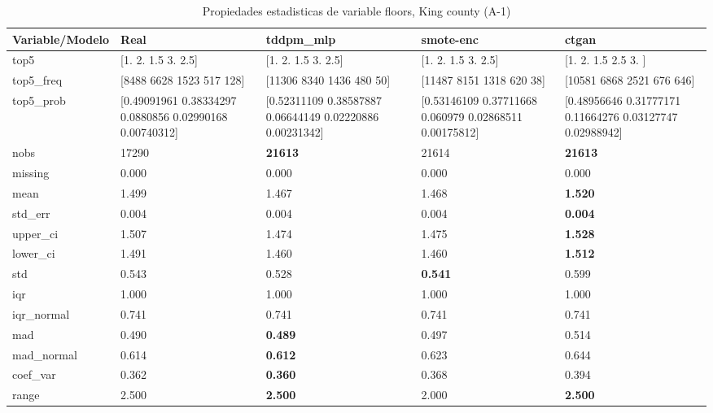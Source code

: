 \begin{table}[H]
\centering
\fontsize{8}{14}\selectfont
\caption{Propiedades  estadisticas de variable floors, King county (A-1)}
\label{table-stats-king county-a-1-floors}
\begin{tabular}{|l|m{10em}|m{10em}|m{10em}|m{10em}|}
\hline
 \rowcolor[gray]{0.8}
Variable/Modelo & Real & tddpm\_mlp & smote-enc & ctgan \\
\hline top5 & [1.  2.  1.5 3.  2.5] & [1.  2.  1.5 3.  2.5] & [1.  2.  1.5 3.  2.5] & [1.  2.  1.5 2.5 3. ] \\
\hline top5\_freq & [8488 6628 1523  517  128] & [11306  8340  1436   480    50] & [11487  8151  1318   620    38] & [10581  6868  2521   676   646] \\
\hline top5\_prob & [0.49091961 0.38334297 0.0880856  0.02990168 0.00740312] & [0.52311109 0.38587887 0.06644149 0.02220886 0.00231342] & [0.53146109 0.37711668 0.060979   0.02868511 0.00175812] & [0.48956646 0.31777171 0.11664276 0.03127747 0.02988942] \\
\hline nobs & 17290 & \bfseries 21613 & \cellcolor[rgb]{0.9, 0.54, 0.52} 21614 & \bfseries 21613 \\
\hline missing & 0.000 & 0.000 & 0.000 & 0.000 \\
\hline mean & 1.499 & \cellcolor[rgb]{0.9, 0.54, 0.52} 1.467 & 1.468 & \bfseries 1.520 \\
\hline std\_err & 0.004 & \cellcolor[rgb]{0.9, 0.54, 0.52} 0.004 & 0.004 & \bfseries 0.004 \\
\hline upper\_ci & 1.507 & \cellcolor[rgb]{0.9, 0.54, 0.52} 1.474 & 1.475 & \bfseries 1.528 \\
\hline lower\_ci & 1.491 & \cellcolor[rgb]{0.9, 0.54, 0.52} 1.460 & 1.460 & \bfseries 1.512 \\
\hline std & 0.543 & 0.528 & \bfseries 0.541 & \cellcolor[rgb]{0.9, 0.54, 0.52} 0.599 \\
\hline iqr & 1.000 & 1.000 & 1.000 & 1.000 \\
\hline iqr\_normal & 0.741 & 0.741 & 0.741 & 0.741 \\
\hline mad & 0.490 & \bfseries 0.489 & 0.497 & \cellcolor[rgb]{0.9, 0.54, 0.52} 0.514 \\
\hline mad\_normal & 0.614 & \bfseries 0.612 & 0.623 & \cellcolor[rgb]{0.9, 0.54, 0.52} 0.644 \\
\hline coef\_var & 0.362 & \bfseries 0.360 & 0.368 & \cellcolor[rgb]{0.9, 0.54, 0.52} 0.394 \\
\hline range & 2.500 & \bfseries 2.500 & \cellcolor[rgb]{0.9, 0.54, 0.52} 2.000 & \bfseries 2.500 \\

\end{tabular}
\end{table}
